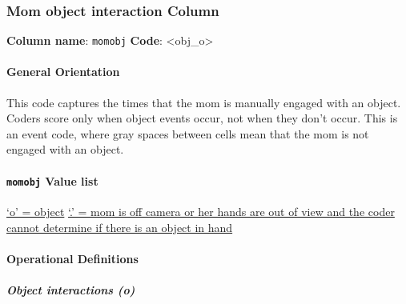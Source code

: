 \documentclass[
]{book}
\begin{document}
\hypertarget{mom-object-interaction-column}{%
\subsubsection*{Mom object interaction Column}\label{mom-object-interaction-column}}

\textbf{Column name}: \texttt{momobj}
\textbf{Code}: \textless obj\_o\textgreater{}

\hypertarget{general-orientation-2}{%
\paragraph*{General Orientation}\label{general-orientation-2}}

This code captures the times that the mom is manually engaged with an object. Coders score only when object events occur, not when they don't occur. This is an event code, where gray spaces between cells mean that the mom is not engaged with an object.

\hypertarget{momobj-value-list}{%
\paragraph*{\texorpdfstring{\texttt{momobj} Value list}{momobj Value list}}\label{momobj-value-list}}

\protect\hyperlink{mom_obj}{`o' = object}
\protect\hyperlink{mom_hands_off_camera}{`.' = mom is off camera or her hands are out of view and the coder cannot determine if there is an object in hand}

\hypertarget{operational-definitions}{%
\paragraph*{Operational Definitions}\label{operational-definitions}}

\hypertarget{mom_obj}{%
\subparagraph*{Object interactions (o)}\label{mom_obj}}
\end{document}
